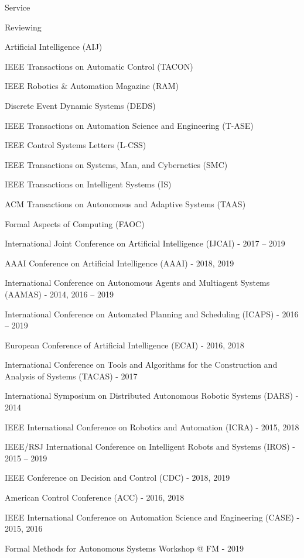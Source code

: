 \begin{rSection}{Service}
\begin{rSubsection}{Reviewing}{}{}{}
\item  Artificial Intelligence (AIJ)
\item  IEEE Transactions on Automatic Control (TACON)
\item  IEEE Robotics \& Automation Magazine (RAM)
\item  Discrete Event Dynamic Systems (DEDS)
\item  IEEE Transactions on Automation Science and Engineering (T-ASE)
\item   IEEE Control Systems Letters (L-CSS)
\item  IEEE Transactions on Systems, Man, and Cybernetics (SMC)
\item   IEEE Transactions on Intelligent Systems (IS)
\item ACM Transactions on Autonomous and Adaptive Systems (TAAS)
\item Formal Aspects of Computing (FAOC)
\item  International Joint Conference on Artificial Intelligence (IJCAI) - 2017 -- 2019
\item  AAAI Conference on Artificial Intelligence (AAAI) - 2018, 2019
\item  International Conference on Autonomous Agents and Multiagent Systems (AAMAS) - 2014, 2016 -- 2019
\item  International Conference on Automated Planning and Scheduling (ICAPS) - 2016 -- 2019
\item  European Conference of Artificial Intelligence (ECAI) - 2016, 2018
\item  International Conference on Tools and Algorithms for the Construction and Analysis of Systems (TACAS) - 2017
\item  International Symposium on Distributed Autonomous Robotic Systems (DARS) - 2014
\item  IEEE International Conference on Robotics and Automation (ICRA) - 2015, 2018
\item  IEEE/RSJ International Conference on Intelligent Robots and Systems (IROS) - 2015 -- 2019
\item  IEEE Conference on Decision and Control (CDC) - 2018, 2019
\item  American Control Conference (ACC) - 2016, 2018
\item  IEEE International Conference on Automation Science and Engineering (CASE) - 2015, 2016
\item Formal Methods for Autonomous Systems Workshop @ FM - 2019

\end{rSubsection}
\end{rSection}
